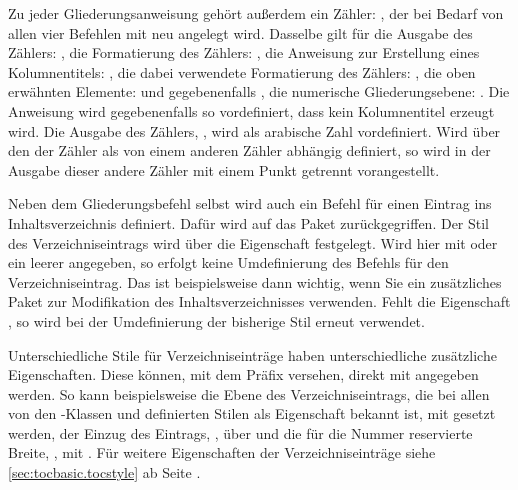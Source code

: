 Zu jeder Gliederungsanweisung gehört außerdem ein Zähler: , der
bei Bedarf von allen vier Befehlen mit  neu angelegt
wird. Dasselbe gilt für die Ausgabe des Zählers: , die
Formatierung des Zählers: , die Anweisung zur
Erstellung eines Kolumnentitels: , die dabei
verwendete Formatierung des Zählers: , die oben
erwähnten Elemente:  und gegebenenfalls
, die numerische Gliederungsebene:
. Die Anweisung  wird
gegebenenfalls so vordefiniert, dass kein Kolumnentitel erzeugt wird. Die
Ausgabe des Zählers, , wird als arabische Zahl
vordefiniert. Wird über den   der
Zähler als von einem anderen Zähler abhängig definiert, so wird in der Ausgabe
dieser andere Zähler mit einem Punkt getrennt vorangestellt.

Neben dem Gliederungsbefehl selbst wird auch ein Befehl für
einen Eintrag ins Inhaltsverzeichnis definiert. Dafür wird auf das Paket
\hyperref[cha:tocbasic]{}%
zurückgegriffen. Der Stil des Verzeichniseintrags wird über die Eigenschaft
 festgelegt. Wird hier mit  oder
 ein leerer  angegeben, so erfolgt
keine Umdefinierung des Befehls für den Verzeichniseintrag. Das ist
beispielsweise dann wichtig, wenn Sie ein zusätzliches Paket zur Modifikation
des Inhaltsverzeichnisses verwenden. Fehlt die Eigenschaft ,
so wird bei der Umdefinierung der bisherige Stil erneut verwendet.

Unterschiedliche Stile für Verzeichniseinträge haben
unterschiedliche zusätzliche Eigenschaften. Diese können, mit dem Präfix
 versehen, direkt mit angegeben werden. So kann beispielsweise die
Ebene des Verzeichniseintrags, die bei allen von den \KOMAScript-Klassen und
\hyperref[cha:tocbasic]{} definierten Stilen als Eigenschaft
 bekannt ist, mit  gesetzt werden, der Einzug
des Eintrags, , über  und die für die Nummer
reservierte Breite, , mit . Für weitere
Eigenschaften der Verzeichniseinträge siehe \autoref{sec:tocbasic.tocstyle} ab
Seite .

